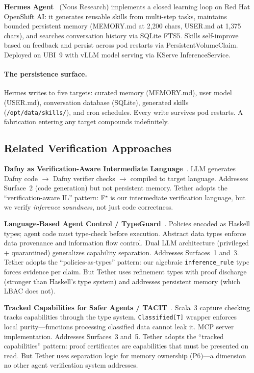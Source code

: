 \documentclass[sigplan,screen,nonacm]{acmart}
\newcommand{\fstar}{F\ensuremath{^\star}}
\begin{document}
\textbf{Hermes Agent}~\cite{hermes2026} (Nous Research) implements a closed
learning loop on Red Hat OpenShift AI: it generates reusable skills from
multi-step tasks, maintains bounded persistent memory (MEMORY.md at 2{,}200
chars, USER.md at 1{,}375 chars), and searches conversation history via
SQLite FTS5. Skills self-improve based on feedback and persist across pod
restarts via PersistentVolumeClaim. Deployed on UBI~9 with vLLM model
serving via KServe InferenceService.

\paragraph{The persistence surface.}
Hermes writes to five targets: curated memory (MEMORY.md), user model
(USER.md), conversation database (SQLite), generated skills
(\texttt{/opt/data/skills/}), and cron schedules. Every write survives pod
restarts. A fabrication entering any target compounds indefinitely.

\subsection{Related Verification Approaches}

\textbf{Dafny as Verification-Aware Intermediate Language}~\cite{li2025dafny}.
LLM generates Dafny code $\to$ Dafny verifier checks $\to$ compiled to
target language. Addresses Surface~2 (code generation) but not persistent
memory. Tether adopts the ``verification-aware IL'' pattern: \fstar{} is our
intermediate verification language, but we verify \emph{inference
soundness}, not just code correctness.

\textbf{Language-Based Agent Control / TypeGuard}~\cite{zhou2026lbac}.
Policies encoded as Haskell types; agent code must type-check before
execution. Abstract data types enforce data provenance and information flow
control. Dual LLM architecture (privileged + quarantined) generalizes
capability separation. Addresses Surfaces~1 and~3. Tether adopts the
``policies-as-types'' pattern: our algebraic \texttt{inference\_rule} type
forces evidence per claim. But Tether uses refinement types with proof
discharge (stronger than Haskell's type system) and addresses persistent
memory (which LBAC does not).

\textbf{Tracked Capabilities for Safer Agents / TACIT}~\cite{odersky2026tacit}.
Scala~3 capture checking tracks capabilities through the type system.
\texttt{Classified[T]} wrapper enforces local purity---functions processing
classified data cannot leak it. MCP server implementation. Addresses
Surfaces~3 and~5. Tether adopts the ``tracked capabilities'' pattern: proof
certificates are capabilities that must be presented on read. But Tether
uses separation logic for memory ownership (P6)---a dimension no other
agent verification system addresses.
\end{document}
